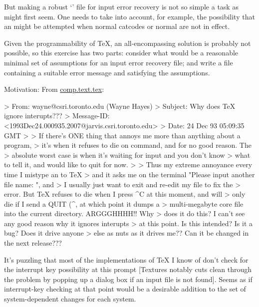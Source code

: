 But making a robust `' file for input error recovery is not so
simple a task as might first seem. One needs to take into account, for
example, the possibility that an \cmd{} might be attempted when normal
catcodes or normal \cmd{\endlinechar} are not in effect.

Given the programmability of TeX, an all-encompassing solution is
probably not possible, so this exercise has two parts: consider what
would be a reasonable minimal set of assumptions for an input error
recovery file; and write a  file containing a suitable 
error message and satisfying the assumptions.

Motivation: From \url{comp.text.tex}:
\begin{lcode}
> From: wayne@csri.toronto.edu (Wayne Hayes)
> Subject: Why does TeX ignore interupts???
> Message-ID: <1993Dec24.000935.2007@jarvis.csri.toronto.edu>
> Date: 24 Dec 93 05:09:35 GMT
> 
> If there's ONE thing that annoys me more than anything about a program,
> it's when it refuses to die on command, and for no good reason.  The
> absolute worst case is when it's waiting for input and you don't know
> what to tell it, and would like to quit for now.
> 
> Thus my extreme annoyance every time I mistype an  to TeX
> and it asks me on the terminal "Please input another file name: ", and
> I usually just want to exit and re-edit my file to fix the 
> error.  But TeX refuses to die when I press ^C at this moment, and will
> only die if I send a QUIT (^\), at which point it dumps a
> multi-megabyte core file into the current directory.  ARGGGHHHH!!  Why
> does it do this?  I can't see any good reason why it ignores interupts
> at this point.  Is this intended?  Is it a bug?  Does it drive anyone
> else as nuts as it drives me??  Can it be changed in the next release???
\end{lcode}

It's puzzling that most of the implementations of TeX I know of don't
check for the interrupt key possibility at this prompt [Textures notably
cuts clean through the problem by popping up a dialog box if an input
file is not found]. Seems as if interrupt-key checking at that point
would be a desirable addition to the set of system-dependent changes for
each system.

\begin{comment}
A summary will be posted circa February 17, 1994.

Michael Downes %
mjd@math.ams.org (Internet) ASCII 32--54,55--126: !"#$%
789:;<=>?@ABCDEFGHIJKLMNOPQRSTUVWXYZ[\]^_`abcdefghijklmnopqrstuvwxyz{|}~
\end{comment}

